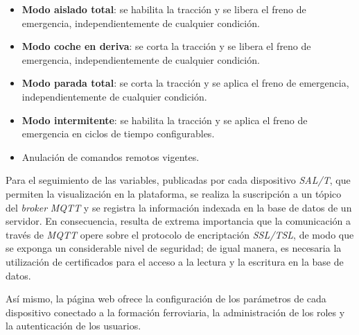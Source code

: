 \begin{itemize}
	\item \textbf{Modo aislado total}: se habilita la tracción y se libera el freno de emergencia, independientemente de cualquier condición. 

    \item \textbf{Modo coche en deriva}: se corta la tracción y se libera el freno de emergencia, independientemente de cualquier condición. 

    \item \textbf{Modo parada total}: se corta la tracción y se aplica el freno de emergencia, independientemente de cualquier condición. 
    
    \item \textbf{Modo intermitente}: se habilita la tracción y se aplica el freno de emergencia en ciclos de tiempo configurables. 

    \item Anulación de comandos remotos vigentes.

\end{itemize}


Para el seguimiento de las variables, publicadas por cada dispositivo \textit{SAL/T}, que permiten la visualización en la plataforma, se realiza la suscripción a un tópico del \textit{broker} \textit{MQTT} y se registra la información indexada en la base de datos de un servidor. En consecuencia, resulta de extrema importancia que la comunicación a través de \textit{MQTT} opere sobre el protocolo de encriptación \textit{SSL/TSL}, de modo que se exponga un considerable nivel de seguridad; de igual manera, es necesaria la utilización de certificados para el acceso a la lectura y la escritura en la base de datos.  

Así mismo, la página web ofrece la configuración de los parámetros de cada dispositivo conectado a la formación ferroviaria, la administración de los roles y la autenticación de los usuarios.

